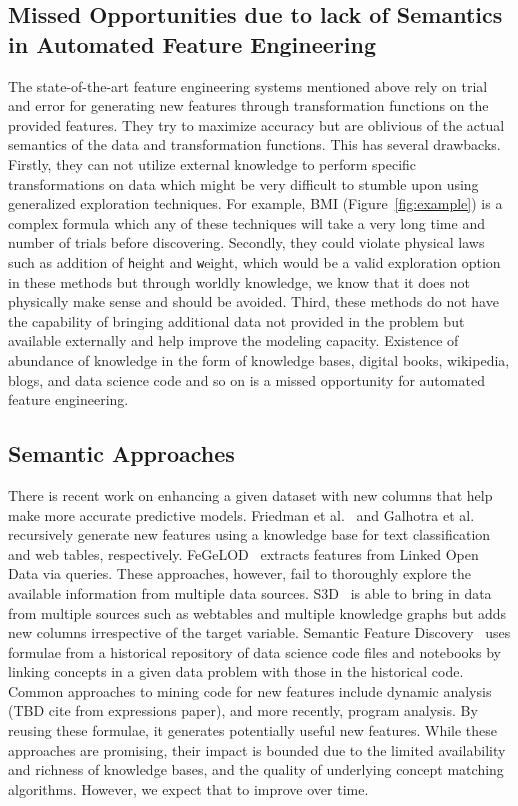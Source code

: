\documentclass[sigconf]{acmart}
\begin{document}
\subsection{Missed Opportunities due to lack of Semantics in Automated Feature Engineering}
The state-of-the-art feature engineering systems mentioned above rely on trial and error for generating new features through transformation functions on the provided features. They try to maximize accuracy but are oblivious of the actual semantics of the data and transformation functions. This has several drawbacks. 
Firstly, they can not utilize external knowledge to perform specific transformations on data which might be very difficult to stumble upon using generalized exploration techniques. For example, BMI (Figure~\ref{fig:example}) is a complex formula which any of these techniques will take a very long time and number of trials before discovering. Secondly, they could violate physical laws such as addition of {\texttt height} and {\texttt weight}, which would be a valid exploration option in these methods but through worldly knowledge, we know that it does not physically make sense and should be avoided. Third, these methods do not have the capability of bringing additional data not provided in the problem but available externally and help improve the modeling capacity. 
Existence of abundance of knowledge in the form of knowledge bases, digital books, wikipedia, blogs, and data science code and so on is a missed opportunity for automated feature engineering.

\subsection{Semantic Approaches}
There is recent work on enhancing a given dataset with new columns that help make more accurate predictive models. Friedman et al.~\cite{friedman2018recursive} and Galhotra et al.~\cite{galhotra2019automated} recursively generate new features using a knowledge base for text classification and web tables, respectively. FeGeLOD~\cite{PH} extracts features from Linked Open Data via queries. These approaches, however, fail to thoroughly explore the available information from multiple data sources. S3D~\cite{s3d} is able to bring in data from multiple sources such as webtables and multiple knowledge graphs but adds new columns irrespective of the target variable. Semantic Feature Discovery~\cite{sfd} uses formulae from a historical repository of data science code files and notebooks by linking concepts in a given data problem with those in the historical code. Common approaches to mining code for new features include dynamic analysis (TBD cite from expressions paper), and more recently, program analysis.  By reusing these formulae, it generates potentially useful new features. While these approaches are promising, their impact is bounded due to the limited availability and richness of knowledge bases, and the quality of underlying concept matching algorithms. However, we expect that to improve over time.
\end{document}
